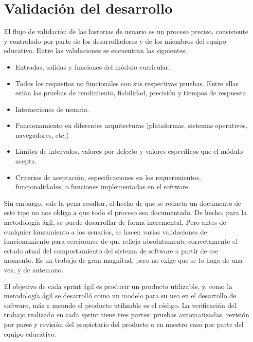 
\chapter{Validación del desarrollo} %

\label{capitulo7} %

El flujo de validación de las historias de usuario es un proceso preciso, consistente y controlado por parte de los desarrolladores y de los miembros del equipo educativo. Entre las validaciones se encuentran las siguientes:
\begin{itemize}
	\item Entradas, salidas y funciones del módulo curricular.
	\item Todos los requisitos no funcionales con sus respectivas pruebas. Entre ellas están las pruebas de rendimiento, fiabilidad, precisión y tiempos de respuesta.
	\item Interacciones de usuario.
	\item Funcionamiento en diferentes arquitecturas (plataformas, sistemas operativos, navegadores, etc.)
	\item Límites de intervalos, valores por defecto y valores específicos que el módulo acepta.
	\item Criterios de aceptación, especificaciones en los requerimientos, funcionalidades, o funciones implementadas en el software.
\end{itemize}

Sin embargo, vale la pena resaltar, el hecho de que se redacta un documento de este tipo no nos obliga a que todo el proceso sea documentado. De hecho, para la metodología ágil, se puede desarrollar de forma incremental. Pero antes de cualquier lanzamiento a los usuarios, se hacen varias validaciones de funcionamiento para cerciorarse de que refleja absolutamente correctamente el estado atual del comportamiento del sistema de software a partir de ese momento. Es un trabajo de gran magnitud, pero no exige que se lo haga de una vez, y de antemano.

El objetivo de cada sprint ágil es producir un producto utilizable, y, como la metodología ágil se desarrolló como un modelo para su uso en el desarrollo de software, más a menudo el producto utilizable es el código. La verificación del trabajo realizado en cada sprint tiene tres partes: pruebas automatizadas, revisión por pares y revisión del propietario del producto o en nuestro caso por parte del equipo educativo.

